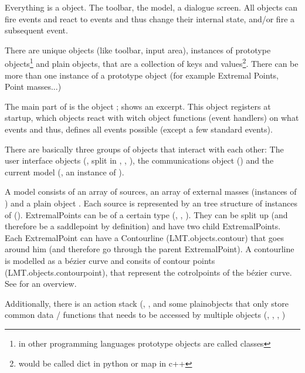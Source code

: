Everything is a object. The toolbar, the model, a dialogue screen.
All objects can fire events and react to events and thus change their internal state, and/or fire a subsequent event.

There are unique objects (like toolbar, input area), instances of prototype objects\footnote{in other programming languages prototype objects are called classes} and plain objects, that are a collection of keys and values\footnote{would be called dict in python or map in c++}. There can be more than one instance of a prototype object (for example Extremal Points, Point masses...)

The main part of \spl is the object ;  shows an excerpt. This object registers at startup, which objects react with witch object functions (event handlers) on what events and thus,  defines all events possible (except a few standard events).


There are basically three groups of objects that interact with each other: The user interface objects (, split in , , ), the communications object () and the current model (, an instance of ).

A model consists of an array of sources, an array of external masses (instances of ) and a plain object .
Each source is represented by an tree structure of instances of  ().
ExtremalPoints can be of a certain type (, , ).
They can be split up (and therefore be a saddlepoint by definition) and have two child ExtremalPoints.
Each ExtremalPoint can have a Contourline (LMT.objects.contour) that goes around him (and therefore go through the parent ExtremalPoint).
A contourline is modelled as a bézier curve and consits of contour points (LMT.objects.contourpoint), that represent the cotrolpoints of the bézier curve. See  for an overview.

Additionally, there is an action stack (, , 
and some plainobjects that only store common data / functions that needs to be accessed by multiple objects (, , , )




